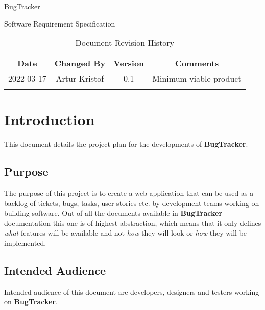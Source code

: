 \documentclass[a4paper]{article}
\newcommand{\appName}{BugTracker}
\newcommand{\appNameBold}{\textbf{BugTracker}}
\begin{document}
    \begin{titlepage}
        \vspace*{\fill}
        \begin{center}
            \huge
            \appName{}

            \vspace{0.4cm}
            \Huge
            Software Requirement Specification

            \vspace{3cm}
            \begin{table}[h]
                \centering
                \caption{Document Revision History}
                \begin{tabular}{cccc}
                    \hline
                    Date & Changed By & Version & Comments \\
                    \hline
                    2022-03-17 & Artur Kristof & 0.1 & Minimum viable product \\
                    \hfill & \hfill & \hfill & \hfill \\
                    \hline
                \end{tabular}
            \end{table}
        \end{center}
        \vspace*{\fill}
    \end{titlepage}

    \tableofcontents

    \section{Introduction}
    This document details the project plan for the developments of \appNameBold{}.

    \subsection{Purpose}
    The purpose of this project is to create a web application that can be used as a backlog of tickets, bugs, tasks, user stories etc. by development teams working on building software.
    Out of all the documents available in \appNameBold{} documentation this one is of highest abstraction, which means that it only defines \textit{what} features will be available
    and not \textit{how} they will look or \textit{how} they will be implemented.

    \subsection{Intended Audience}
    Intended audience of this document are developers, designers and testers working on \appNameBold{}.
\end{document}
